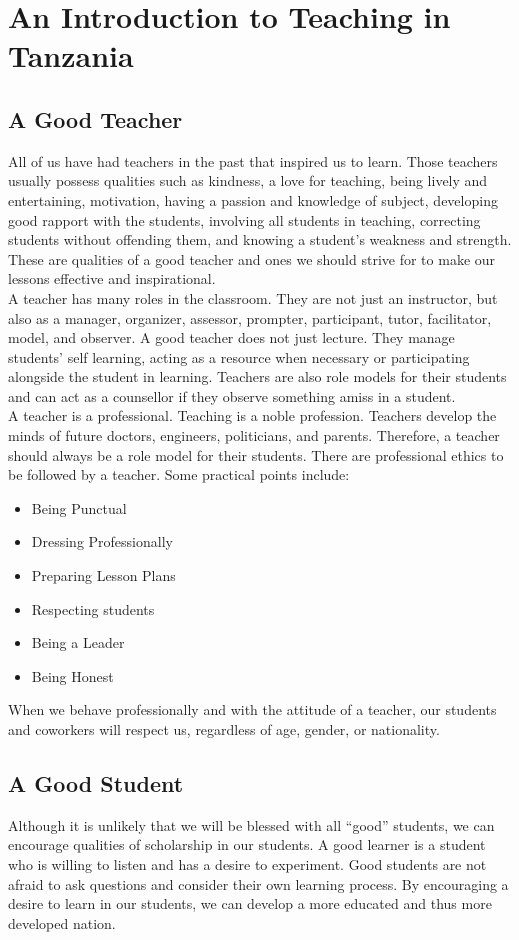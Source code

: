 \chapter{An Introduction to Teaching in Tanzania}
\section{A Good Teacher}
All of us have had teachers in the past that inspired us to learn.  Those teachers usually possess qualities such as kindness, a love for teaching, being lively and entertaining, motivation, having a passion and knowledge of subject, developing good rapport with the students, involving all students in teaching, correcting students without offending them, and knowing a student's weakness and strength.  These are qualities of a good teacher and ones we should strive for to make our lessons effective and inspirational.\\

A teacher has many roles in the classroom.  They are not just an instructor, but also as a manager, organizer, assessor, prompter, participant, tutor, facilitator, model, and observer.  A good teacher does not just lecture.  They manage students’ self learning, acting as a resource when necessary or participating alongside the student in learning.  Teachers are also role models for their students and can act as a counsellor if they observe something amiss in a student.\\

A teacher is a professional. Teaching is a noble profession.  Teachers develop the minds of future doctors, engineers, politicians, and parents.  Therefore, a teacher should always be a role model for their students. There are professional ethics to be followed by a teacher. Some practical points include:
\begin{itemize}
\item Being Punctual
\item Dressing Professionally
\item Preparing Lesson Plans
\item Respecting students 
\item Being a Leader
\item Being Honest
\end{itemize}

When we behave professionally and with the attitude of a teacher, our students and coworkers will respect us, regardless of age, gender, or nationality.  

\section{A Good Student}
Although it is unlikely that we will be blessed with all ``good'' students, we can encourage qualities of scholarship in our students.  A good learner is a student who is willing to listen and has a desire to experiment.  Good students are not afraid to ask questions and consider their own learning process.  By encouraging a desire to learn in our students, we can develop a more educated and thus more developed nation. \\


